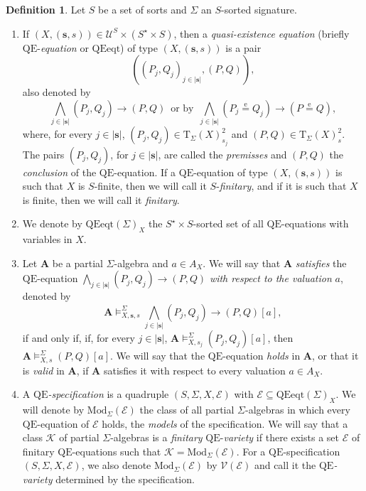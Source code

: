 \documentclass[a4paper, reqno
]{amsart}
\newcommand{\bb}[1]{\ensuremath{\lvert #1 \rvert}}
\newcommand{\eeq}{\overset{\mathrm e}{=}}      %
\newcommand{\QE}{\mathrm{QE}}
\theoremstyle{plain}
\theoremstyle{definition}
\newtheorem{definition}[theorem]{Definition}
\begin{document}
\begin{definition}\label{DQEEq}
Let $S$ be a set of sorts and $\Sigma$ an $S$-sorted signature.
\begin{enumerate}
\item If $(X,(\mathbf{s},s))\in\boldsymbol{\mathcal{U}}^{S}\times (S^{\star}\times S)$, then a \emph{quasi-existence equation} (briefly $\QE$-\emph{equation} or $\mathrm{QEeqt}$) of type $(X,(\mathbf{s},s))$ is a pair
$$
\left(\left(
P_{j},Q_{j}
\right)_{j\in \bb{\mathbf{s}}},(P,Q)\right),
$$
also denoted by
$$
\textstyle
\bigwedge_{j\in\bb{\mathbf{s}}}(P_{j},Q_{j})\to (P,Q)\, \text{ or by }\,
\bigwedge_{j\in\bb{\mathbf{s}}}(P_{j}\eeq Q_{j})\to (P\eeq Q),
$$
where, for every $j\in \bb{\mathbf{s}}$, $(P_{j},Q_{j})\in\mathrm{T}_{\Sigma}(X)^{2}_{s_{j}}$ and $(P,Q)\in \mathrm{T}_{\Sigma}(X)^{2}_{s}$.
The pairs $(P_{j},Q_{j})$, for $j\in \bb{\mathbf{s}}$, are called the \emph{premisses} and $(P,Q)$ the \emph{conclusion} of the $\QE$-equation.
If a $\QE$-equation of type $(X,(\mathbf{s}, s))$ is such that $X$ is $S$-finite, then we will call it $S$-\emph{finitary}, and if it is such that $X$ is finite, then we will call it \emph{finitary}.
\item We denote by $\mathrm{QEeqt}(\Sigma)_{X}$ the $S^{\star}\times S$-sorted set of all $\QE$-equations with variables in $X$.
\item Let $\mathbf{A}$ be a partial $\Sigma$-algebra and $a\in A_{X}$.
We will say that $\mathbf{A}$ \emph{satisfies} the $\QE$-equation $\bigwedge_{j\in\bb{\mathbf{s}}}(P_{j},Q_{j})\to (P,Q)$ \emph{with respect to the valuation} $a$, denoted by
      $$
      \textstyle
      \mathbf{A}\models^{\Sigma}_{X,\mathbf{s},s}\bigwedge_{j\in\bb{\mathbf{s}}}(P_{j},Q_{j})\to (P,Q) [a],
      $$
      if and only if, if, for every $j\in \bb{\mathbf{s}}$, $\mathbf{A}\models^{\Sigma}_{X,s_{j}} (P_{j},Q_{j})[a]$, then $\mathbf{A}\models^{\Sigma}_{X,s} (P,Q)[a]$.
We will say that the $\QE$-equation \emph{holds} in $\mathbf{A}$, or that it is \emph{valid} in $\mathbf{A}$, if $\mathbf{A}$ satisfies it with respect to every valuation $a\in A_{X}$.
\item A \emph{$\QE$-specification} is a quadruple $(S,\Sigma,X,\mathcal{E})$ with $\mathcal{E}\subseteq\mathrm{QEeqt}(\Sigma)_{X}$.
We will denote by $\mathrm{Mod}_{\Sigma}(\mathcal{E})$ the class of all partial $\Sigma$-algebras in which every $\QE$-equation of $\mathcal{E}$ holds, the \emph{models} of the specification.
We will say that a class $\boldsymbol{\mathcal{K}}$ of partial $\Sigma$-algebras is a \emph{finitary} $\QE$-\emph{variety} if there exists a set $\mathcal{E}$ of finitary $\QE$-equations such that $\boldsymbol{\mathcal{K}} = \mathrm{Mod}_{\Sigma}(\mathcal{E})$.
For a $\QE$-specification $(S,\Sigma,X,\mathcal{E})$, we also denote $\mathrm{Mod}_{\Sigma}(\mathcal{E})$ by $\mathcal{V}(\mathcal{E})$ and call it the \emph{$\QE$-variety} determined by the specification.
\end{enumerate}
\end{definition}
\end{document}
